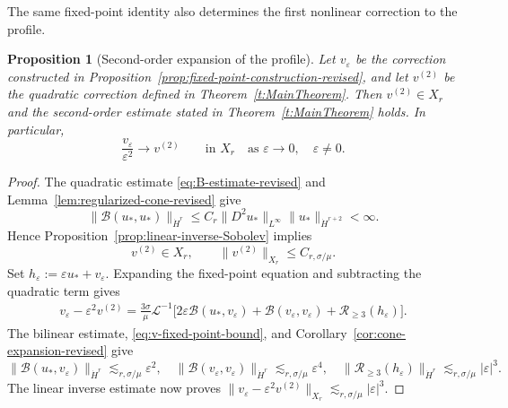 \documentclass[12pt]{amsart}
\newtheorem{proposition}[theorem]{Proposition}
\theoremstyle{remark}
\theoremstyle{definition}
\numberwithin{equation}{section}
\begin{document}
The same fixed-point identity also determines the first nonlinear correction to the profile.

\begin{proposition}[Second-order expansion of the profile]
\label{prop:second-order-profile-expansion}
Let \(v_\varepsilon\) be the correction constructed in Proposition~\ref{prop:fixed-point-construction-revised}, and let \(v^{(2)}\) be the quadratic correction defined in Theorem~\ref{t:MainTheorem}.
Then \(v^{(2)}\in X_r\) and the second-order estimate stated in Theorem~\ref{t:MainTheorem} holds.
In particular,
\[
 \frac{v_\varepsilon}{\varepsilon^2} \longrightarrow v^{(2)}
 \qquad\text{in }X_r
 \quad\text{as }\varepsilon\to0,\quad \varepsilon\neq0.
\]
\end{proposition}

\begin{proof}
The quadratic estimate \eqref{eq:B-estimate-revised} and Lemma~\ref{lem:regularized-cone-revised} give
\[
 \|\mathcal B(u_*,u_*)\|_{\dot H^r} \leq C_r \|D^2u_*\|_{L^\infty} \|u_*\|_{\dot H^{r+2}} <\infty.
\]
Hence Proposition~\ref{prop:linear-inverse-Sobolev} implies
\[
 v^{(2)}\in X_r, \qquad \|v^{(2)}\|_{X_r}\leq C_{r,\sigma/\mu}.
\]
Set \(h_\varepsilon:=\varepsilon u_*+v_\varepsilon\).
Expanding the fixed-point equation and subtracting the quadratic term gives
\begin{equation*}
\begin{aligned}
 v_\varepsilon-\varepsilon^2v^{(2)} = \frac{3\sigma}{\mu}\mathcal L^{-1} \Big[ 2\varepsilon\mathcal B(u_*,v_\varepsilon) +\mathcal B(v_\varepsilon,v_\varepsilon) +\mathscr R_{\geq3}(h_\varepsilon) \Big].
\end{aligned}
\end{equation*}
The bilinear estimate, \eqref{eq:v-fixed-point-bound}, and
Corollary~\ref{cor:cone-expansion-revised} give
\begin{equation*}
 \|\mathcal B(u_*,v_\varepsilon)\|_{\dot H^r}\lesssim_{r,\sigma/\mu}\varepsilon^2, \quad
 \|\mathcal B(v_\varepsilon,v_\varepsilon)\|_{\dot H^r}\lesssim_{r,\sigma/\mu}\varepsilon^4,\quad
 \|\mathscr R_{\geq3}(h_\varepsilon)\|_{\dot H^r} \lesssim_{r,\sigma/\mu}|\varepsilon|^3.
\end{equation*}
The linear inverse estimate now proves
\(\|v_\varepsilon-\varepsilon^2v^{(2)}\|_{X_r}
\lesssim_{r,\sigma/\mu}|\varepsilon|^3\).
\end{proof}
\end{document}
